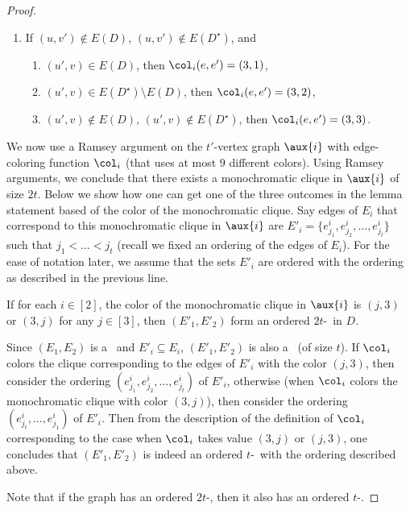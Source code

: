\begin{proof}
\begin{enumerate}
\item If $(u,v') \not \in E(D)$, $(u,v') \not \in E(D^{\star})$, and
\begin{enumerate}
\item $(u',v) \in E(D)$, then $\col_i(e,e') =(3,1)$,
\item $(u',v) \in E(D^{\star}) \setminus E(D)$, then $\col_i(e,e') =(3,2)$,
\item $(u',v) \not \in E(D)$, $(u',v) \not \in E(D^{\star})$, then $\col_i(e,e') = (3,3)$.
\end{enumerate}
\end{enumerate}

We now use a Ramsey argument on the $t'$-vertex graph $\aux{i}$ with edge-coloring function $\col_i$ (that uses at most $9$ different colors). Using Ramsey arguments, we conclude that there exists a monochromatic clique in $\aux{i}$ of size $2t$. Below we show how one can get one of the three outcomes in the lemma statement based of the color of the monochromatic clique. Say edges of $E_i$ that correspond to this monochromatic clique in $\aux{i}$ are 
$E'_i=\{e^i_{j_1}, e^i_{j_2}, \ldots , e^i_{j_{t}}\}$ such that $j_1 < \ldots < j_{t}$ (recall we fixed an ordering of the edges of $E_i$). For the ease of notation later, we assume that the sets $E'_i$ are ordered with the ordering as described in the previous line.

\begin{claim}\label{claim:ramsey-orderedpair}
If for each $i \in [2]$, the color of the monochromatic clique in $\aux{i}$ is $(j,3)$ or $(3,j)$ for any $j \in [3]$, then $(E'_1,E'_2)$ form an ordered $2t$-\toughpair\ in $D$.
\end{claim}

\begin{claimproof}
Since $(E_1,E_2)$ is a \toughpair\ and $E'_i \subseteq E_i$, $(E'_1,E'_2)$ is also a \toughpair\ (of size $t$). If $\col_i$ colors the clique corresponding to the edges of $E'_i$ with the color $(j,3)$, then consider the ordering $(e^i_{j_1}, e^i_{j_2}, \ldots , e^i_{j_{t}})$ of $E'_i$, otherwise (when $\col_i$ colors the monochromatic clique with color $(3,j)$), then consider the ordering $(e^i_{j_{t}}, \ldots , e^i_{j_1})$ of $E'_i$. Then from the description of the definition of $\col_i$ corresponding to the case when $\col_i$ takes value $(3,j)$ or $(j,3)$, one concludes that $(E'_1,E'_2)$ is indeed an ordered $t$-\toughpair\ with the ordering described above.
\end{claimproof}
Note that if the graph has an ordered $2t$-\toughpair, then it also has an ordered $t$-\toughpair.


\end{proof}
